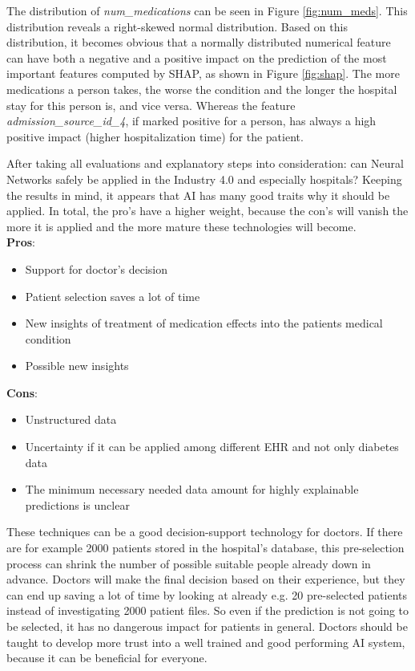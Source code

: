 \documentclass[journal]{IEEEtran}
\begin{document}
The distribution of \textit{num\_medications} can be seen in Figure \ref{fig:num_meds}. This distribution reveals a right-skewed normal distribution. Based on this distribution, it becomes obvious that a normally distributed numerical feature can have both a negative and a positive impact on the prediction of the most important features computed by SHAP, as shown in Figure \ref{fig:shap}. The more medications a person takes, the worse the condition and the longer the hospital stay for this person is, and vice versa. Whereas the feature \textit{admission\_source\_id\_4}, if marked positive for a person, has always a high positive impact (higher hospitalization time) for the patient.  

After taking all evaluations and explanatory steps into consideration: can Neural Networks safely be applied in the Industry 4.0 and especially hospitals? Keeping the results in mind, it appears that AI has many good traits why it should be applied. In total, the pro's have a higher weight, because the con's will vanish the more it is applied and the more mature these technologies will become. \\ 

\textbf{Pros}: 

\begin{itemize}
	\item Support for doctor's decision
	\item Patient selection saves a lot of time
	\item New insights of treatment of medication effects into the patients medical condition
	\item Possible new insights \\
\end{itemize}

\textbf{Cons}: 

\begin{itemize}
	\item Unstructured data
	\item Uncertainty if it can be applied among different EHR and not only diabetes data
	\item The minimum necessary needed data amount for highly explainable predictions is unclear \\
\end{itemize}

These techniques can be a good decision-support technology for doctors. If there are for example 2000 patients stored in the hospital's database, this pre-selection process can shrink the number of possible suitable people already down in advance. Doctors will make the final decision based on their experience, but they can end up saving a lot of time by looking at already e.g. 20 pre-selected patients instead of investigating 2000 patient files. So even if the prediction is not going to be selected, it has no dangerous impact for patients in general. Doctors should be taught to develop more trust into a well trained and good performing AI system, because it can be beneficial for everyone.
\end{document}
